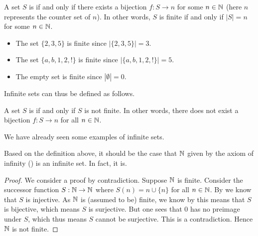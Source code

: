 \begin{definition}
    A set $S$ is  if and only if there exists a bijection $f: S \to n$ for some $n \in \mathbb{N}$ (here $n$ represents the counter set of $n$). In other words, $S$ is finite if and only if $|S| = n$ for some $n \in \mathbb{N}$.
\end{definition}

\begin{example}
    \begin{itemize}[leftmargin=*]
        \item The set $\{2, 3, 5\}$ is finite since $|\{2, 3, 5\}| = 3$.
        \item The set $\{a, b, 1, 2, !\}$ is finite since $|\{a, b, 1, 2, !\}| = 5$.
        \item The empty set is finite since $|\emptyset| = 0$.
    \end{itemize}
\end{example}

Infinite sets can thus be defined as follows.

\begin{definition}
    A set $S$ is  if and only if $S$ is not finite. In other words, there does not exist a bijection $f: S \to n$ for all $n \in \mathbb{N}$.
\end{definition}

We have already seen some examples of infinite sets.

\begin{example}[$\N$]
    \setlength{\parindent}{1.5em}
    Based on the definition above, it should be the case that $\N$ given by the axiom of infinity () is an infinite set. In fact, it is.
    \begin{proof}
        We consider a proof by contradiction. Suppose $\N$ is finite. Consider the successor function $S: \mathbb{N} \to \mathbb{N}$ where $S(n) = n \cup \{n\}$ for all $n \in \mathbb{N}$. By  we know that $S$ is injective. As $\N$ is (assumed to be) finite, we know by  this means that $S$ is bijective, which means $S$ is surjective. But one sees that 0 has no preimage under $S$, which thus means $S$ cannot be surjective. This is a contradiction. Hence $\N$ is not finite.
    \end{proof}
\end{example}

